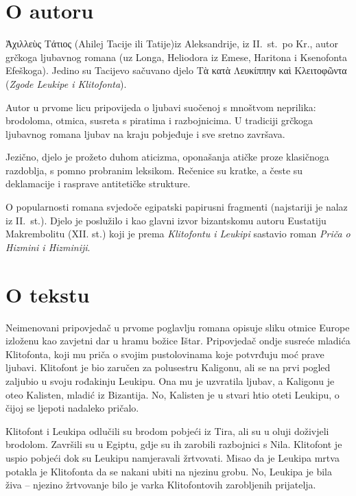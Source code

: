 
\section*{O autoru}

Ἀχιλλεὺς Τάτιος (Ahilej Tacije ili Tatije)iz Aleksandrije, iz II.~st.\ po Kr., autor grčkoga ljubavnog romana (uz Longa, Heliodora iz Emese, Haritona i Ksenofonta Efeškoga). Jedino su Tacijevo sačuvano djelo \textgreek{Τὰ κατὰ Λευκίππην καὶ Κλειτοφῶντα} (\textit{Zgode Leukipe i Klitofonta}).

Autor u prvome licu pripovijeda o ljubavi suočenoj s mnoštvom neprilika: brodoloma, otmica, susreta s piratima i razbojnicima. U tradiciji grčkoga ljubavnog romana ljubav na kraju pobjeđuje i sve sretno završava.

Jezično, djelo je prožeto duhom aticizma, oponašanja atičke proze klasičnoga razdoblja, s pomno probranim leksikom. Rečenice su kratke, a česte su deklamacije i rasprave antitetičke strukture.

O popularnosti romana svjedoče egipatski papirusni fragmenti (najstariji je nalaz iz II.~st.). Djelo je poslužilo i kao glavni izvor bizantskomu autoru Eustatiju Makrembolitu (XII. st.) koji je prema \textit{Klitofontu i Leukipi} sastavio roman \textit{Priča o Hizmini i Hizminiji}.


\section*{O tekstu}

Neimenovani pripovjedač u prvome poglavlju romana opisuje sliku otmice Europe izloženu kao zavjetni dar u hramu božice Ištar. Pripovjedač ondje susreće mladića Klitofonta, koji mu priča o svojim pustolovinama koje potvrđuju moć prave ljubavi. Klitofont je bio zaručen za polusestru Kaligonu, ali se na prvi pogled zaljubio u svoju rođakinju Leukipu. Ona mu je uzvratila ljubav, a Kaligonu je oteo Kalisten, mladić iz Bizantija. No, Kalisten je u stvari htio oteti Leukipu, o čijoj se ljepoti nadaleko pričalo.

Klitofont i Leukipa odlučili su brodom pobjeći iz Tira, ali su u oluji doživjeli brodolom. Završili su u Egiptu, gdje su ih zarobili razbojnici s Nila. Klitofont je uspio pobjeći dok su Leukipu namjeravali žrtvovati. Misao da je Leukipa mrtva potakla je Klitofonta da se nakani ubiti na njezinu grobu. No, Leukipa je bila živa – njezino žrtvovanje bilo je varka Klitofontovih zarobljenih prijatelja.

